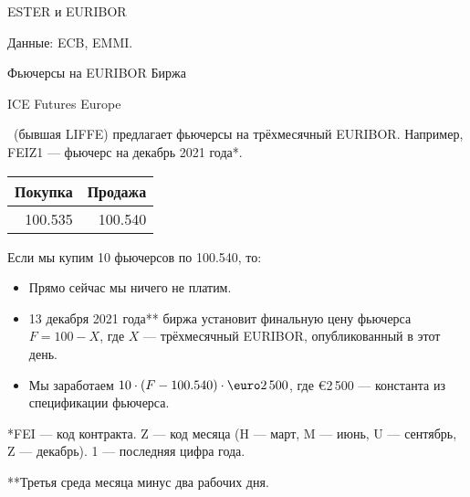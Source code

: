 \documentclass{beamer}
\renewcommand{\EUR}[1]{\textup{\euro}#1}
\newcommand{\en}[1]{\begin{otherlanguage}{english}#1\end{otherlanguage}}
\begin{document}
\newcommand{\plotBenchmarkRate}[2] {
	
	\addplot[
		color = #2,
		mark = none,
		thick
	]
	table[
		x=date,
		y=#1,
		col sep=comma
	]
	{euro_benchmark.csv};
}



\begin{frame}{ESTER и EURIBOR}
\centering
{}

\scriptsize Данные: ECB, EMMI.
\end{frame}



\begin{frame}{Фьючерсы на EURIBOR}
\justify
Биржа \en{ICE Futures Europe}\ (бывшая LIFFE) предлагает фьючерсы на трёхмесячный EURIBOR. Например, \alert{FEIZ1} --- фьючерс на декабрь 2021 года*.

\justify
\centering
\begin{tabular}{r|r}
Покупка & Продажа \\ \hline
100.535 & 100.540
\end{tabular}

\justify
Если мы купим 10 фьючерсов по 100.540, то:
\begin{itemize}
\justifying
\item Прямо сейчас мы ничего не платим.
\item 13 декабря 2021 года** биржа установит финальную цену фьючерса $F = 100 - X$, где $X$ --- трёхмесячный EURIBOR, опубликованный в этот день.
\item Мы заработаем $10 \cdot (F - 100.540) \cdot \EUR{2\,500}$, где \EUR{2\,500} --- константа из спецификации фьючерса.
\end{itemize}

\justify
*FEI --- код контракта. Z --- код месяца (H --- март, M --- июнь, U --- сентябрь, Z --- декабрь). 1 --- последняя цифра года.

\justify
**Третья среда месяца минус два рабочих дня.
\end{frame}
\end{document}

